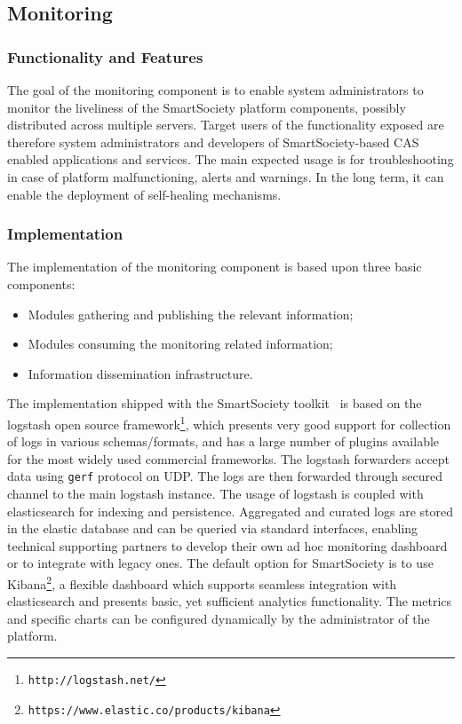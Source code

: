 \subsection{Monitoring}
\subsubsection{Functionality and Features}
The goal of the monitoring component is to enable system administrators to monitor the liveliness of the SmartSociety platform components, possibly distributed across multiple servers. Target users of the functionality exposed are therefore system administrators and developers of SmartSociety-based CAS enabled applications and services. The main expected usage is for troubleshooting in case of platform malfunctioning, alerts and warnings. In the long term, it can enable the deployment of self-healing mechanisms.


\subsubsection{Implementation}
The implementation of the monitoring component is based upon three basic components:
\begin{itemize}
\item Modules gathering and publishing the relevant information;
\item Modules consuming the monitoring related information;
\item Information dissemination infrastructure.
\end{itemize}
The implementation shipped with the SmartSociety toolkit~\cite{D8.3} is based on the logstash open source framework\footnote{{\tt http://logstash.net/}}, which presents very good support for collection of logs in various schemas/formats, and has a large number of plugins available for the most widely used commercial frameworks. The logstash forwarders accept data using {\tt gerf} protocol on UDP. The logs are then forwarded through secured channel to the main logstash instance.
 The usage of logstash is coupled with elasticsearch for indexing and persistence. Aggregated and curated logs are stored in the elastic database and can be queried via standard interfaces, enabling technical supporting partners to develop their own ad hoc monitoring dashboard or to integrate with legacy ones. The default option for SmartSociety is to use Kibana\footnote{{\tt https://www.elastic.co/products/kibana}}, a flexible dashboard which supports seamless integration with elasticsearch and presents basic, yet sufficient analytics functionality. The metrics and specific charts can be configured dynamically by the administrator of the platform.
